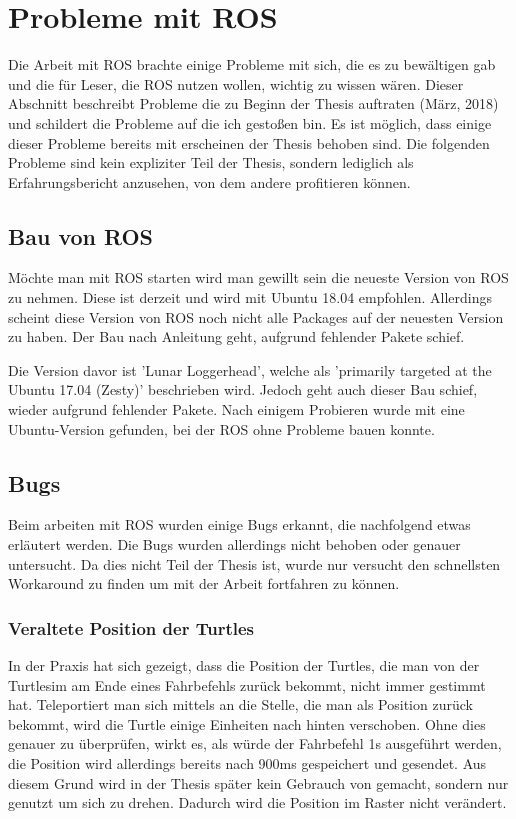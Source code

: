 \section{Probleme mit ROS}
Die Arbeit mit ROS brachte einige Probleme mit sich, die es zu bewältigen gab und die für Leser, die ROS nutzen wollen, wichtig zu wissen wären. Dieser Abschnitt beschreibt Probleme die zu Beginn der Thesis auftraten (März, 2018) und schildert die Probleme auf die ich gestoßen bin. Es ist möglich, dass einige dieser Probleme bereits mit erscheinen der Thesis behoben sind. Die folgenden Probleme sind kein expliziter Teil der Thesis, sondern lediglich als Erfahrungsbericht anzusehen, von dem andere profitieren können.

\subsection*{Bau von ROS}
Möchte man mit ROS starten wird man gewillt sein die neueste Version von ROS zu nehmen. Diese ist derzeit  und wird mit Ubuntu 18.04 empfohlen. Allerdings scheint diese Version von ROS noch nicht alle Packages auf der neuesten Version zu haben. Der Bau nach Anleitung geht, aufgrund fehlender Pakete schief.

Die Version davor ist 'Lunar Loggerhead', welche als 'primarily targeted at the Ubuntu 17.04 (Zesty)' beschrieben wird. Jedoch geht auch dieser Bau schief, wieder aufgrund fehlender Pakete. Nach einigem Probieren wurde mit  eine Ubuntu-Version gefunden, bei der ROS ohne Probleme bauen konnte.

\subsection*{Bugs}
Beim arbeiten mit ROS wurden einige Bugs erkannt, die nachfolgend etwas erläutert werden. Die Bugs wurden allerdings nicht behoben oder genauer untersucht. Da dies nicht Teil der Thesis ist, wurde nur versucht den schnellsten Workaround zu finden um mit der Arbeit fortfahren zu können.

\subsubsection*{Veraltete Position der Turtles}
In der Praxis hat sich gezeigt, dass die Position der Turtles, die man von der Turtlesim am Ende eines Fahrbefehls zurück bekommt, nicht immer gestimmt hat. Teleportiert man sich mittels  an die Stelle, die man als Position zurück bekommt, wird die Turtle einige Einheiten nach hinten verschoben. Ohne dies genauer zu überprüfen, wirkt es, als würde der Fahrbefehl 1s ausgeführt werden, die Position wird allerdings bereits nach 900ms gespeichert und gesendet.
Aus diesem Grund wird in der Thesis später kein Gebrauch von  gemacht, sondern nur  genutzt um sich zu drehen. Dadurch wird die Position im Raster nicht verändert.

